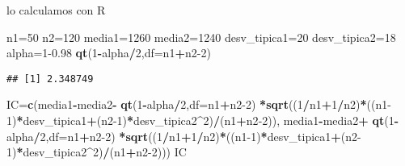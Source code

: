 \documentclass[
]{article}
\newenvironment{Shaded}{\begin{snugshade}}{\end{snugshade}}
\newcommand{\DataTypeTok}[1]{\textcolor[rgb]{0.13,0.29,0.53}{#1}}
\newcommand{\DecValTok}[1]{\textcolor[rgb]{0.00,0.00,0.81}{#1}}
\newcommand{\FloatTok}[1]{\textcolor[rgb]{0.00,0.00,0.81}{#1}}
\newcommand{\KeywordTok}[1]{\textcolor[rgb]{0.13,0.29,0.53}{\textbf{#1}}}
\newcommand{\NormalTok}[1]{#1}
\newcommand{\OperatorTok}[1]{\textcolor[rgb]{0.81,0.36,0.00}{\textbf{#1}}}
\newcommand{\StringTok}[1]{\textcolor[rgb]{0.31,0.60,0.02}{#1}}
\begin{document}
lo calculamos con R

\begin{Shaded}
\begin{Highlighting}[]
\NormalTok{n1=}\DecValTok{50}
\NormalTok{n2=}\DecValTok{120}
\NormalTok{media1=}\DecValTok{1260}
\NormalTok{media2=}\DecValTok{1240}
\NormalTok{desv\_tipica1=}\DecValTok{20}
\NormalTok{desv\_tipica2=}\DecValTok{18}
\NormalTok{alpha=}\DecValTok{1}\FloatTok{{-}0.98}
\KeywordTok{qt}\NormalTok{(}\DecValTok{1}\OperatorTok{{-}}\NormalTok{alpha}\OperatorTok{/}\DecValTok{2}\NormalTok{,}\DataTypeTok{df=}\NormalTok{n1}\OperatorTok{+}\NormalTok{n2}\DecValTok{{-}2}\NormalTok{)}
\end{Highlighting}
\end{Shaded}

\begin{verbatim}
## [1] 2.348749
\end{verbatim}

\begin{Shaded}
\begin{Highlighting}[]
\NormalTok{IC=}\KeywordTok{c}\NormalTok{(media1}\OperatorTok{{-}}\NormalTok{media2}\OperatorTok{{-}}\StringTok{ }\KeywordTok{qt}\NormalTok{(}\DecValTok{1}\OperatorTok{{-}}\NormalTok{alpha}\OperatorTok{/}\DecValTok{2}\NormalTok{,}\DataTypeTok{df=}\NormalTok{n1}\OperatorTok{+}\NormalTok{n2}\DecValTok{{-}2}\NormalTok{)}
     \OperatorTok{*}\KeywordTok{sqrt}\NormalTok{((}\DecValTok{1}\OperatorTok{/}\NormalTok{n1}\OperatorTok{+}\DecValTok{1}\OperatorTok{/}\NormalTok{n2)}\OperatorTok{*}\NormalTok{((n1}\DecValTok{{-}1}\NormalTok{)}\OperatorTok{*}\NormalTok{desv\_tipica1}\OperatorTok{+}\NormalTok{(n2}\DecValTok{{-}1}\NormalTok{)}\OperatorTok{*}\NormalTok{desv\_tipica2}\OperatorTok{\^{}}\DecValTok{2}\NormalTok{)}\OperatorTok{/}\NormalTok{(n1}\OperatorTok{+}\NormalTok{n2}\DecValTok{{-}2}\NormalTok{)),}
\NormalTok{     media1}\OperatorTok{{-}}\NormalTok{media2}\OperatorTok{+}\StringTok{ }\KeywordTok{qt}\NormalTok{(}\DecValTok{1}\OperatorTok{{-}}\NormalTok{alpha}\OperatorTok{/}\DecValTok{2}\NormalTok{,}\DataTypeTok{df=}\NormalTok{n1}\OperatorTok{+}\NormalTok{n2}\DecValTok{{-}2}\NormalTok{)}
     \OperatorTok{*}\KeywordTok{sqrt}\NormalTok{((}\DecValTok{1}\OperatorTok{/}\NormalTok{n1}\OperatorTok{+}\DecValTok{1}\OperatorTok{/}\NormalTok{n2)}\OperatorTok{*}\NormalTok{((n1}\DecValTok{{-}1}\NormalTok{)}\OperatorTok{*}\NormalTok{desv\_tipica1}\OperatorTok{+}\NormalTok{(n2}\DecValTok{{-}1}\NormalTok{)}\OperatorTok{*}\NormalTok{desv\_tipica2}\OperatorTok{\^{}}\DecValTok{2}\NormalTok{)}\OperatorTok{/}\NormalTok{(n1}\OperatorTok{+}\NormalTok{n2}\DecValTok{{-}2}\NormalTok{)))}
\NormalTok{IC}
\end{Highlighting}
\end{Shaded}
\end{document}

